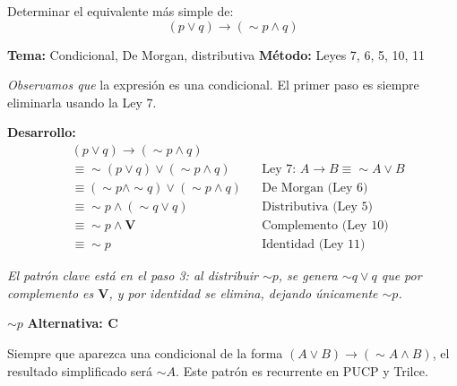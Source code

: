 \begin{tcolorbox}[
  enhanced, breakable,
  colback=GrisClaro, colframe=AzulPizarra,
  fonttitle=\bfseries\sffamily,
  title={Ejercicio 3 --- Nivel Intermedio (PUCP)},
  arc=3pt, boxrule=0.8pt
]
\begin{problema}
  Determinar el equivalente más simple de:
  \[
    (p \vee q) \rightarrow (\sim p \wedge q)
  \]
\end{problema}

\smallskip
\noindent
\textbf{\sffamily\color{AzulMedio}Tema:} Condicional, De Morgan, distributiva
\hfill
\textbf{\sffamily\color{AzulMedio}M\'{e}todo:} Leyes 7, 6, 5, 10, 11

\medskip
\noindent\textit{Observamos que} la expresión es una condicional. El primer
paso es siempre eliminarla usando la Ley 7.

\medskip
\noindent\textbf{\sffamily Desarrollo:}
\begin{align*}
  &(p \vee q) \rightarrow (\sim p \wedge q) \\[6pt]
  &\equiv \sim(p \vee q) \vee (\sim p \wedge q)
  && \text{Ley 7: } A \to B \equiv \sim A \vee B \\[6pt]
  &\equiv (\sim p \wedge \sim q) \vee (\sim p \wedge q)
  && \text{De Morgan (Ley 6)} \\[6pt]
  &\equiv \sim p \wedge (\sim q \vee q)
  && \text{Distributiva (Ley 5)} \\[6pt]
  &\equiv \sim p \wedge \mathbf{V}
  && \text{Complemento (Ley 10)} \\[6pt]
  &\equiv \sim p
  && \text{Identidad (Ley 11)}
\end{align*}

\noindent\textit{El patrón clave está en el paso 3: al distribuir $\sim p$,
se genera $\sim q \vee q$ que por complemento es $\mathbf{V}$, y por
identidad se elimina, dejando únicamente $\sim p$.}

\medskip
\begin{tcolorbox}[
  colback=AzulClaro!60, colframe=AzulPizarra,
  arc=2pt, boxrule=0.8pt, left=8pt, right=8pt
]
\centering
$\displaystyle \boxed{\sim p}$
\quad \textbf{Alternativa: C}
\end{tcolorbox}

\begin{cajatip}
  Siempre que aparezca una condicional de la forma
  $(A \vee B) \rightarrow (\sim A \wedge B)$, el resultado simplificado
  será $\sim A$. Este patrón es recurrente en PUCP y Trilce.
\end{cajatip}
\end{tcolorbox}
\vspace{0.5cm}

